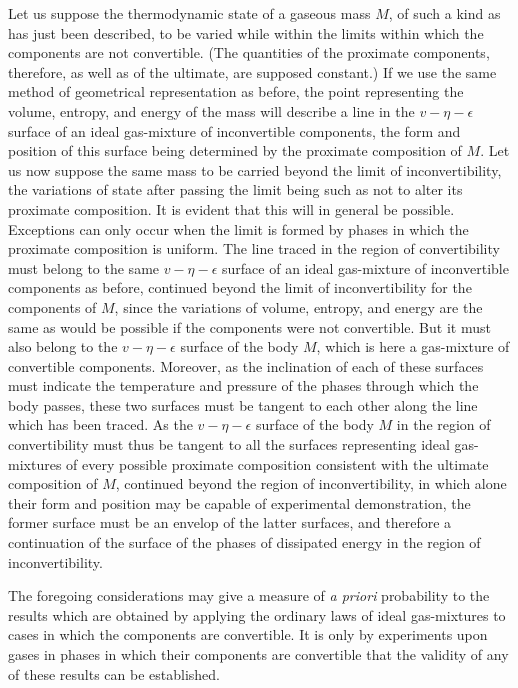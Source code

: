 \documentclass[12pt]{memoir}
\begin{document}
Let us suppose the thermodynamic state of a gaseous mass $M$, of such a kind as has just been described, to be varied while within the limits within which the components are not convertible. (The quantities of the proximate components, therefore, as well as of the ultimate, are supposed constant.) If we use the same method of geometrical representation as before, the point representing the volume, entropy, and energy of the mass will describe a line in the $v\!-\eta\!-\epsilon$ surface of an ideal gas-mixture of inconvertible components, the form and position of this surface being determined by the proximate composition of $M$. Let us now suppose the same mass to be carried beyond the limit of inconvertibility, the variations of state after passing the limit being such as not to alter its proximate composition. It is evident that this will in general be possible. Exceptions can only occur when the limit is formed by phases in which the proximate composition is uniform. The line traced in the region of convertibility must belong to the same $v\!-\eta\!-\epsilon$ surface of an ideal gas-mixture of inconvertible components as before, continued beyond the limit of inconvertibility for the components of $M$, since the variations of volume, entropy, and energy are the same as would be possible if the components were not convertible. But it must also belong to the $v\!-\eta\!-\epsilon$ surface of the body $M$, which is here a gas-mixture of convertible components. Moreover, as the inclination of each of these surfaces must indicate the temperature and pressure of the phases through which the body passes, these two surfaces must be tangent to each other along the line which has been traced. As the $v\!-\eta\!-\epsilon$ surface of the body $M$ in the region of convertibility must thus be tangent to all the surfaces representing ideal gas-mixtures of every possible proximate composition consistent with the ultimate composition of $M$, continued beyond the region of inconvertibility, in which alone their form and position may be capable of experimental demonstration, the former surface must be an envelop of the latter surfaces, and therefore a continuation of the surface of the phases of dissipated energy in the region of inconvertibility.


The foregoing considerations may give a measure of \textit{a priori} probability to the results which are obtained by applying the ordinary laws of ideal gas-mixtures to cases in which the components are convertible. It is only by experiments upon gases in phases in which their components are convertible that the validity of any of these results can be established.
\end{document}

